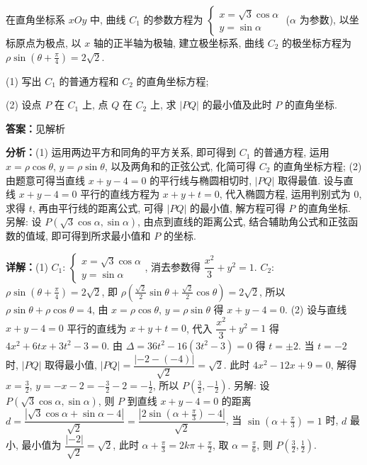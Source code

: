 \begin{question}[points=10]
在直角坐标系 $xOy$ 中, 曲线 $C_1$ 的参数方程为 $\begin{cases}x=\sqrt{3}\cos\alpha\\ y=\sin\alpha\end{cases}$ ($\alpha$ 为参数), 以坐标原点为极点, 以 $x$ 轴的正半轴为极轴, 建立极坐标系, 曲线 $C_2$ 的极坐标方程为 $\rho\sin(\theta+\frac{\pi}{4})=2\sqrt{2}$.

(1) 写出 $C_1$ 的普通方程和 $C_2$ 的直角坐标方程;

(2) 设点 $P$ 在 $C_1$ 上, 点 $Q$ 在 $C_2$ 上, 求 $|PQ|$ 的最小值及此时 $P$ 的直角坐标.
\begin{solution}
\textbf{答案：}见解析

\textbf{分析：}(1) 运用两边平方和同角的平方关系, 即可得到 $C_1$ 的普通方程, 运用 $x=\rho\cos\theta$, $y=\rho\sin\theta$, 以及两角和的正弦公式, 化简可得 $C_2$ 的直角坐标方程;
(2) 由题意可得当直线 $x+y-4=0$ 的平行线与椭圆相切时, $|PQ|$ 取得最值. 设与直线 $x+y-4=0$ 平行的直线方程为 $x+y+t=0$, 代入椭圆方程, 运用判别式为 $0$, 求得 $t$, 再由平行线的距离公式, 可得 $|PQ|$ 的最小值, 解方程可得 $P$ 的直角坐标. 另解: 设 $P(\sqrt{3}\cos\alpha,\sin\alpha)$, 由点到直线的距离公式, 结合辅助角公式和正弦函数的值域, 即可得到所求最小值和 $P$ 的坐标.

\textbf{详解：}(1) $C_1$: $\begin{cases}x=\sqrt{3}\cos\alpha\\ y=\sin\alpha\end{cases}$, 消去参数得 $\dfrac{x^2}{3}+y^2=1$. $C_2$: $\rho\sin(\theta+\frac{\pi}{4})=2\sqrt{2}$, 即 $\rho(\frac{\sqrt{2}}{2}\sin\theta+\frac{\sqrt{2}}{2}\cos\theta)=2\sqrt{2}$, 所以 $\rho\sin\theta+\rho\cos\theta=4$, 由 $x=\rho\cos\theta$, $y=\rho\sin\theta$ 得 $x+y-4=0$.
(2) 设与直线 $x+y-4=0$ 平行的直线为 $x+y+t=0$, 代入 $\dfrac{x^2}{3}+y^2=1$ 得 $4x^2+6tx+3t^2-3=0$. 由 $\Delta=36t^2-16(3t^2-3)=0$ 得 $t=\pm2$. 当 $t=-2$ 时, $|PQ|$ 取得最小值, $|PQ|=\dfrac{|-2-(-4)|}{\sqrt{2}}=\sqrt{2}$. 此时 $4x^2-12x+9=0$, 解得 $x=\frac{3}{2}$, $y=-x-2=-\frac{3}{2}-2=-\frac{1}{2}$, 所以 $P(\frac{3}{2},-\frac{1}{2})$.
另解: 设 $P(\sqrt{3}\cos\alpha,\sin\alpha)$, 则 $P$ 到直线 $x+y-4=0$ 的距离 $d=\dfrac{|\sqrt{3}\cos\alpha+\sin\alpha-4|}{\sqrt{2}}=\dfrac{|2\sin(\alpha+\frac{\pi}{3})-4|}{\sqrt{2}}$, 当 $\sin(\alpha+\frac{\pi}{3})=1$ 时, $d$ 最小, 最小值为 $\dfrac{|-2|}{\sqrt{2}}=\sqrt{2}$, 此时 $\alpha+\frac{\pi}{3}=2k\pi+\frac{\pi}{2}$, 取 $\alpha=\frac{\pi}{6}$, 则 $P(\frac{3}{2},\frac{1}{2})$.
\end{solution}
\end{question}

